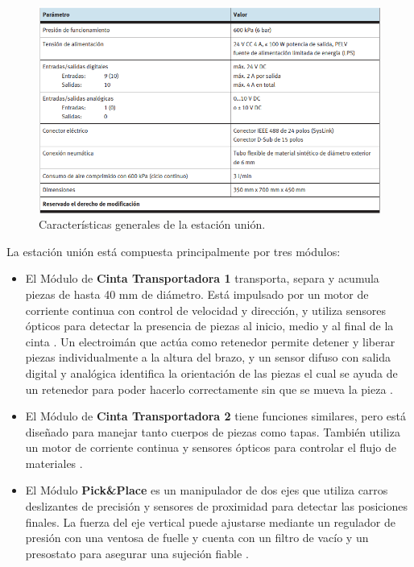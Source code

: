 \begin{figure} [h!]
  \begin{center}
    \includegraphics[width=14.5cm]{figs/estacion_union_3}
  \end{center}
  \caption{\centering Características generales de la estación unión. \cite{estacion_union}}
  \label{fig:estacion_union_3}
\end{figure} 

La estación unión está compuesta principalmente por tres módulos:

\begin{itemize}

	 \item El Módulo de \textbf{Cinta Transportadora 1} transporta, separa y acumula piezas de hasta 40 mm de diámetro. Está impulsado por un motor de corriente continua con control de velocidad y dirección, y utiliza sensores ópticos para detectar la presencia de piezas al inicio, medio y al final de la cinta \cite{estacion_union}. Un electroimán que actúa como retenedor permite detener y liberar piezas individualmente a la altura del brazo, y un sensor difuso con salida digital y analógica identifica la orientación de las piezas el cual se ayuda de un retenedor para poder hacerlo correctamente sin que se mueva la pieza \cite{estacion_union}.

	 \item El Módulo de \textbf{Cinta Transportadora 2} tiene funciones similares, pero está diseñado para manejar tanto cuerpos de piezas como tapas. También utiliza un motor de corriente continua y sensores ópticos para controlar el flujo de materiales \cite{estacion_union}.

	 \item El Módulo \textbf{Pick\&Place} es un manipulador de dos ejes que utiliza carros deslizantes de precisión y sensores de proximidad para detectar las posiciones finales. La fuerza del eje vertical puede ajustarse mediante un regulador de presión con una ventosa de fuelle y cuenta con un filtro de vacío y un presostato para asegurar una sujeción fiable \cite{estacion_union}.
\end{itemize}

